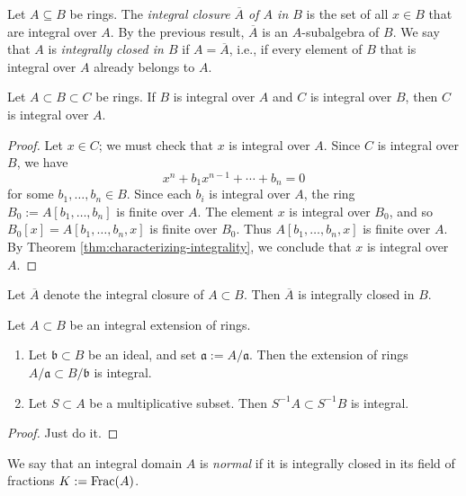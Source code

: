 \documentclass[reqno]{amsart}
\begin{document}
\begin{definition}
  Let $A \subseteq B$ be rings.
  The \emph{integral closure $\overline{A}$ of $A$ in $B$}
  is the set of all $x \in B$ that are integral over $A$.
  By the previous result, $\overline{A}$ is an $A$-subalgebra of $B$.
  We say that $A$ is \emph{integrally closed in $B$}
  if $A = \overline{A}$,
  i.e., if every element of $B$ that is integral over $A$ already belongs to $A$.
\end{definition}

\begin{lemma}
  Let $A \subset B \subset C$ be rings.
  If $B$ is integral over $A$ and
  $C$ is integral over $B$,
  then $C$ is integral over $A$.
\end{lemma}
\begin{proof}
  Let $x \in C$;
  we must check that $x$ is integral over $A$.
  Since $C$ is integral over $B$, we have
  \[
  x^n + b_1 x^{n-1} + \dotsb + b_n = 0
  \]
  for some $b_1,\dotsc,b_n \in B$.  Since each $b_i$ is integral
  over $A$, the ring $B_0 := A[b_1,\dotsc,b_n]$ is finite over
  $A$.  The element $x$ is integral over $B_0$, and so
  $B_0[x]= A[b_1,\dotsc,b_n,x]$ is finite over $B_0$.  Thus
  $A[b_1,\dotsc,b_n,x]$ is finite over $A$.  By Theorem
  \ref{thm:characterizing-integrality}, we conclude that $x$ is
  integral over $A$.
\end{proof}

\begin{corollary}
  Let $\overline{A}$ denote the integral
  closure of $A \subset B$.
  Then $\overline{A}$ is integrally closed in $B$.
\end{corollary}


\begin{lemma}
  Let $A \subset B$ be an integral extension of rings.
  \begin{enumerate}
  \item Let $\mathfrak{b} \subset B$ be an ideal, and set
    $\mathfrak{a} := A/\mathfrak{a}$.
    Then
    the extension of rings
    $A / \mathfrak{a} \subset B / \mathfrak{b}$ is integral.
  \item Let $S \subset A$ be a multiplicative subset.
    Then $S^{-1} A \subset S^{-1} B$ is integral.
  \end{enumerate}
\end{lemma}
\begin{proof}
  Just do it.
\end{proof}

\begin{definition}
  We say that an integral domain $A$ is \emph{normal}
  if it is integrally closed in its field of fractions $K := \operatorname{Frac}(A)$.
\end{definition}
\end{document}
